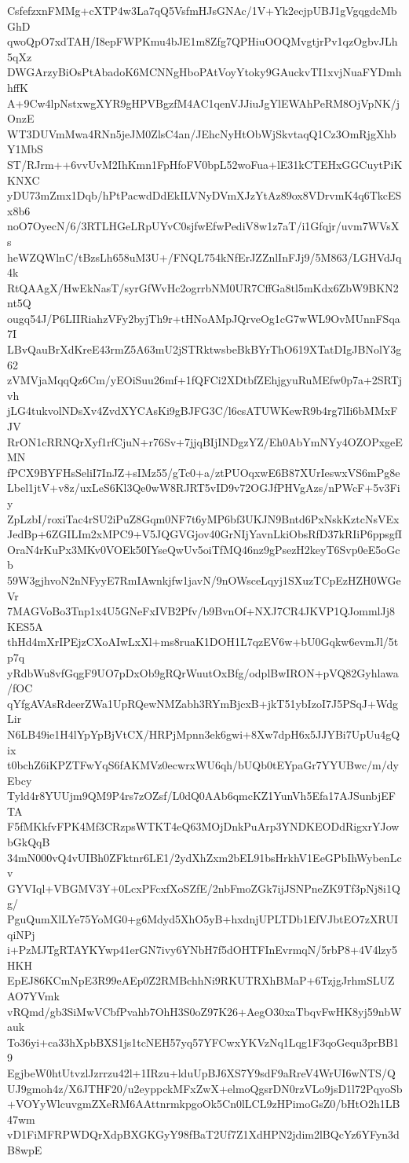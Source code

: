 CsfefzxnFMMg+cXTP4w3La7qQ5VsfmHJsGNAc/1V+Yk2ecjpUBJ1gVgqgdcMbGhD
qwoQpO7xdTAH/I8epFWPKmu4bJE1m8Zfg7QPHiuOOQMvgtjrPv1qzOgbvJLh5qXz
DWGArzyBiOsPtAbadoK6MCNNgHboPAtVoyYtoky9GAuckvTI1xvjNuaFYDmhhffK
A+9Cw4lpNstxwgXYR9gHPVBgzfM4AC1qenVJJiuJgYlEWAhPeRM8OjVpNK/jOnzE
WT3DUVmMwa4RNn5jeJM0ZlsC4an/JEhcNyHtObWjSkvtaqQ1Cz3OmRjgXhbY1MbS
ST/RJrm++6vvUvM2IhKmn1FpHfoFV0bpL52woFua+lE31kCTEHxGGCuytPiKKNXC
yDU73mZmx1Dqb/hPtPacwdDdEkILVNyDVmXJzYtAz89ox8VDrvmK4q6TkcESx8b6
noO7OyecN/6/3RTLHGeLRpUYvC0sjfwEfwPediV8w1z7aT/i1Gfqjr/uvm7WVsXs
heWZQWlnC/tBzsLh658uM3U+/FNQL754kNfErJZZnlInFJj9/5M863/LGHVdJq4k
RtQAAgX/HwEkNasT/syrGfWvHc2ogrrbNM0UR7CffGa8tl5mKdx6ZbW9BKN2nt5Q
ougq54J/P6LIIRiahzVFy2byjTh9r+tHNoAMpJQrveOg1cG7wWL9OvMUnnFSqa7I
LBvQauBrXdKreE43rmZ5A63mU2jSTRktwsbeBkBYrThO619XTatDIgJBNolY3g62
zVMVjaMqqQz6Cm/yEOiSuu26mf+1fQFCi2XDtbfZEhjgyuRuMEfw0p7a+2SRTjvh
jLG4tukvolNDsXv4ZvdXYCAsKi9gBJFG3C/l6csATUWKewR9b4rg7lIi6bMMxFJV
RrON1cRRNQrXyf1rfCjuN+r76Sv+7jjqBIjINDgzYZ/Eh0AbYmNYy4OZOPxgeEMN
fPCX9BYFHsSeliI7InJZ+sIMz55/gTc0+a/ztPUOqxwE6B87XUrIeswxVS6mPg8e
Lbel1jtV+v8z/uxLeS6Kl3Qe0wW8RJRT5vID9v72OGJfPHVgAzs/nPWcF+5v3Fiy
ZpLzbI/roxiTac4rSU2iPuZ8Gqm0NF7t6yMP6bf3UKJN9Bntd6PxNskKztcNsVEx
JedBp+6ZGILIm2xMPC9+V5JQGVGjov40GrNIjYavnLkiObsRfD37kRIiP6ppsgfI
OraN4rKuPx3MKv0VOEk50IYseQwUv5oiTfMQ46nz9gPsezH2keyT6Svp0eE5oGcb
59W3gjhvoN2nNFyyE7RmIAwnkjfw1javN/9nOWsceLqyj1SXuzTCpEzHZH0WGeVr
7MAGVoBo3Tnp1x4U5GNeFxIVB2Pfv/b9BvnOf+NXJ7CR4JKVP1QJommlJj8KES5A
thHd4mXrIPEjzCXoAIwLxXl+ms8ruaK1DOH1L7qzEV6w+bU0Gqkw6evmJl/5tp7q
yRdbWu8vfGqgF9UO7pDxOb9gRQrWuutOxBfg/odplBwIRON+pVQ82Gyhlawa/fOC
qYfgAVAsRdeerZWa1UpRQewNMZabh3RYmBjcxB+jkT51ybIzoI7J5PSqJ+WdgLir
N6LB49ie1H4lYpYpBjVtCX/HRPjMpnn3ek6gwi+8Xw7dpH6x5JJYBi7UpUu4gQix
t0bchZ6iKPZTFwYqS6fAKMVz0ecwrxWU6qh/bUQb0tEYpaGr7YYUBwc/m/dyEbcy
Tyld4r8YUUjm9QM9P4rs7zOZsf/L0dQ0AAb6qmcKZ1YunVh5Efa17AJSunbjEFTA
F5fMKkfvFPK4Mf3CRzpsWTKT4eQ63MOjDnkPuArp3YNDKEODdRigxrYJowbGkQqB
34mN000vQ4vUIBh0ZFktnr6LE1/2ydXhZxm2bEL91bsHrkhV1EeGPbIhWybenLcv
GYVIql+VBGMV3Y+0LcxPFcxfXoSZfE/2nbFmoZGk7ijJSNPneZK9Tf3pNj8i1Qg/
PguQumXlLYe75YoMG0+g6Mdyd5XhO5yB+hxdnjUPLTDb1EfVJbtEO7zXRUIqiNPj
i+PzMJTgRTAYKYwp41erGN7ivy6YNbH7f5dOHTFInEvrmqN/5rbP8+4V4lzy5HKH
EpEJ86KCmNpE3R99eAEp0Z2RMBchhNi9RKUTRXhBMaP+6TzjgJrhmSLUZAO7YVmk
vRQmd/gb3SiMwVCbfPvahb7OhH3S0oZ97K26+AegO30xaTbqvFwHK8yj59nbWauk
To36yi+ca33hXpbBXS1js1tcNEH57yq57YFCwxYKVzNq1Lqg1F3qoGequ3prBB19
EgjbeW0htUtvzlJzrrzu42l+1IRzu+lduUpBJ6XS7Y9sdF9aRreV4WrUI6wNTS/Q
UJ9gmoh4z/X6JTHF20/u2eyppckMFxZwX+elmoQgsrDN0rzVLo9jsD1l72PqyoSb
+VOYyWlcuvgmZXeRM6AAttnrmkpgoOk5Cn0lLCL9zHPimoGsZ0/bHtO2h1LB47wm
vD1FiMFRPWDQrXdpBXGKGyY98fBaT2Uf7Z1XdHPN2jdim2lBQcYz6YFyn3dB8wpE
